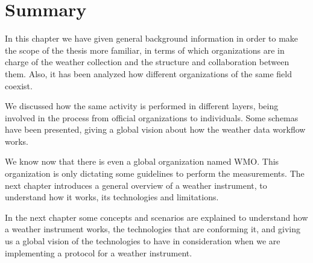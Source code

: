 \section{Summary}

In this chapter we have given general background information in order to make the scope of the thesis more familiar, in terms of which organizations are in charge of the weather collection and the structure and collaboration between them. Also, it has been analyzed how different organizations of the same field coexist.

We discussed how the same activity is performed in different layers, being involved in the process from official organizations to individuals. Some schemas have been presented, giving a global vision about how the weather data workflow works.

We know now that there is even a global organization named \gls{WMO}. This organization is only dictating some guidelines to perform the measurements. The next chapter introduces a general overview of a weather instrument, to understand how it works, its technologies and limitations.

In the next chapter some concepts and scenarios are explained to understand how a weather instrument works, the technologies that are conforming it, and giving us a global vision of the technologies to have in consideration when we are implementing a protocol for a weather instrument.

\pagebreak
